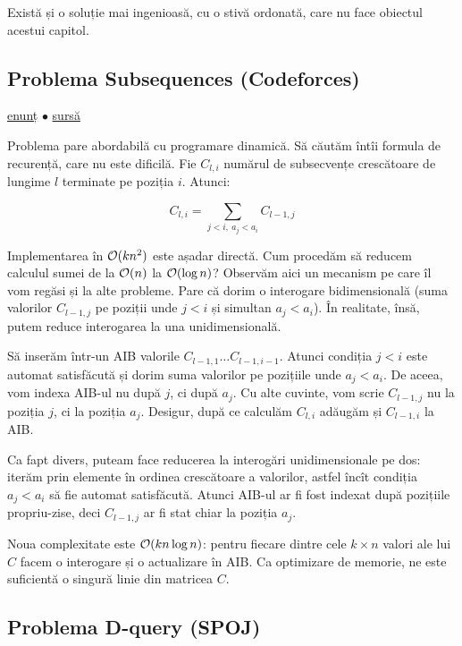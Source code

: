 \documentclass[../main.tex]{subfiles}
\begin{document}
Există și o soluție mai ingenioasă, cu o stivă ordonată, care nu face obiectul acestui capitol.

\subsection{Problema Subsequences (Codeforces)}
\label{problem:subsequences}

\href{https://codeforces.com/contest/597/problem/C}{enunț}
$\bullet$
\hyperref[code:subsequences]{sursă}

Problema pare abordabilă cu programare dinamică. Să căutăm întîi formula de recurență, care nu este dificilă. Fie $C_{l,i}$ numărul de subsecvențe crescătoare de lungime $l$ terminate pe poziția $i$. Atunci:

$$C_{l,i} = \sum_{j < i,\ a_j < a_i} C_{l-1,j}$$

Implementarea în $\mathcal{O}(kn^2)$ este așadar directă. Cum procedăm să reducem calculul sumei de la $\mathcal{O}(n)$ la $\mathcal{O}(\log n)$? Observăm aici un mecanism pe care îl vom regăsi și la alte probleme. Pare că dorim o interogare bidimensională (suma valorilor $C_{l-1,j}$ pe poziții unde $j < i$ și simultan $a_j < a_i$). În realitate, însă, putem reduce interogarea la una unidimensională.

Să inserăm într-un AIB valorile $C_{l-1,1} \dots C_{l-1, i-1}$. Atunci condiția $j < i$ este automat satisfăcută și dorim suma valorilor pe pozițiile unde $a_j < a_i$. De aceea, vom indexa AIB-ul nu după $j$, ci după $a_j$. Cu alte cuvinte, vom scrie $C_{l-1,j}$ nu la poziția $j$, ci la poziția $a_j$. Desigur, după ce calculăm $C_{l,i}$ adăugăm și $C_{l-1,i}$ la AIB.

Ca fapt divers, puteam face reducerea la interogări unidimensionale pe dos: iterăm prin elemente în ordinea crescătoare a valorilor, astfel încît condiția $a_j < a_i$ să fie automat satisfăcută. Atunci AIB-ul ar fi fost indexat după pozițiile propriu-zise, deci $C_{l-1,j}$ ar fi stat chiar la poziția $a_j$.

Noua complexitate este $\mathcal{O}(kn \log n)$: pentru fiecare dintre cele $k \times n$ valori ale lui $C$ facem o interogare și o actualizare în AIB. Ca optimizare de memorie, ne este suficientă o singură linie din matricea $C$.

\subsection{Problema D-query (SPOJ)}
\label{problem:dquery-fenwick}
\end{document}
